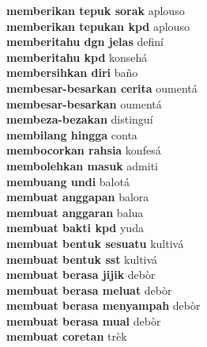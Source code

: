 \textbf{ memberikan tepuk sorak  } aplouso \\
\textbf{ memberikan tepukan kpd  } aplouso \\
\textbf{ memberitahu dgn jelas  } definí \\
\textbf{ memberitahu kpd  } konsehá \\
\textbf{ membersihkan diri  } baño \\
\textbf{ membesar-besarkan cerita  } oumentá \\
\textbf{ membesar-besarkan  } oumentá \\
\textbf{ membeza-bezakan  } distinguí \\
\textbf{ membilang hingga  } conta \\
\textbf{ membocorkan rahsia  } konfesá \\
\textbf{ membolehkan masuk  } admiti \\
\textbf{ membuang undi  } balotá \\
\textbf{ membuat anggapan  } balora \\
\textbf{ membuat anggaran  } balua \\
\textbf{ membuat bakti kpd  } yuda \\
\textbf{ membuat bentuk sesuatu  } kultivá \\
\textbf{ membuat bentuk sst  } kultivá \\
\textbf{ membuat berasa jijik  } debòr \\
\textbf{ membuat berasa meluat  } debòr \\
\textbf{ membuat berasa menyampah  } debòr \\
\textbf{ membuat berasa mual  } debòr \\
\textbf{ membuat coretan  } trèk \\

